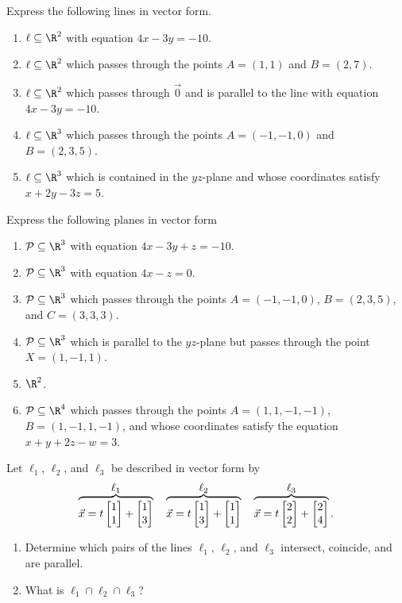 \begin{exercises}
	\begin{problist}
		\prob  Express the following lines in vector form.
		\begin{enumerate}
			\item   $\ell\subseteq\R^2$ with equation $4x-3y=-10$.
			\item   $\ell\subseteq\R^2$ which passes through the points $A=(1,1)$ and $B=(2,7)$.
			\item   $\ell\subseteq\R^2$ which passes through $\vec 0$ and is parallel to the line
				with equation $4x-3y=-10$.
			\item   $\ell\subseteq\R^3$ which passes through the points $A=(-1,-1,0)$ and $B=(2,3,5)$.
			\item   $\ell\subseteq\R^3$ which is contained in the $yz$-plane and
				whose coordinates satisfy $x+2y-3z=5$.
		\end{enumerate}
		\prob Express the following planes in vector form
		\begin{enumerate}
			\item   $\mathcal P\subseteq\R^3$ with equation $4x-3y+z=-10$.
			\item   $\mathcal P\subseteq\R^3$ with equation $4x-z=0$.
			\item   $\mathcal P\subseteq\R^3$ which passes through the points $A=(-1,-1,0)$, $B=(2,3,5)$, and $C=(3,3,3)$.
			\item   $\mathcal P\subseteq\R^3$ which is parallel to the $yz$-plane but passes through the point $X=(1,-1,1)$.
			\item   $\R^2$.
			\item   $\mathcal P\subseteq\R^4$ which passes through the points $A=(1,1,-1,-1)$, $B=(1,-1,1,-1)$,
				and whose coordinates satisfy the equation $x+y+2z-w=3$.
		\end{enumerate}
		\prob Let $\ell_1$, $\ell_2$, and $\ell_3$ be described in vector form by
		\[
			\overbrace{\vec x=t\mat{1\\1}+\mat{1\\3}}^{\displaystyle \ell_1}
			\quad
			\overbrace{\vec x=t\mat{1\\3}+\mat{1\\1}}^{\displaystyle \ell_2}
			\quad
			\overbrace{\vec x=t\mat{2\\2}+\mat{2\\4}}^{\displaystyle \ell_3}.
		\]
		\begin{enumerate}
			\item
				Determine which pairs of the lines $\ell_1$, $\ell_2$, and $\ell_3$ intersect, 
				coincide, and are parallel.
			\item What is $\ell_1\cap\ell_2\cap\ell_3$?
		\end{enumerate}


\end{problist}
\end{exercises}
